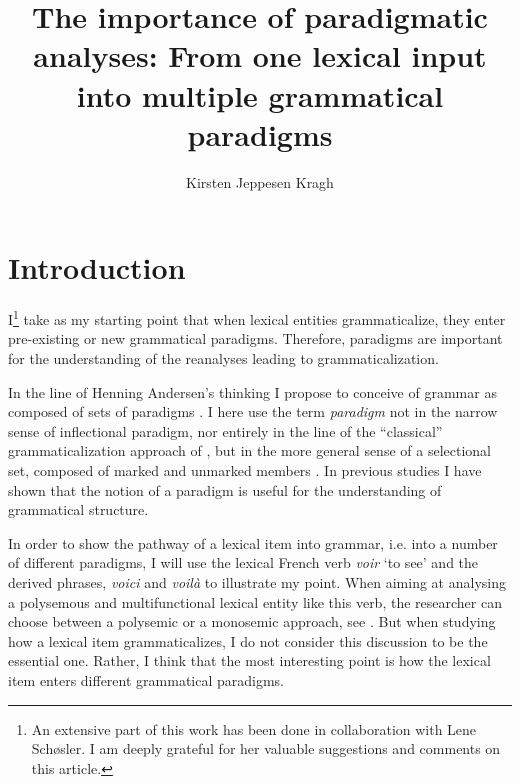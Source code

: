 \documentclass[output=paper]{langsci/langscibook}
\author{Kirsten Jeppesen Kragh\affiliation{University of Copenhagen}}
\title[The importance of paradigmatic analyses]{The importance of paradigmatic analyses: From one lexical input into multiple grammatical paradigms}
\begin{document}
\maketitle 

\section{Introduction} \label{kragh:1}

I\footnote{An extensive part of this work has been done in collaboration with Lene Schøsler. I am deeply grateful for her valuable suggestions and comments on this article.} take as my starting point that when lexical entities grammaticalize, they enter pre-existing or new grammatical paradigms. Therefore, paradigms are important for the understanding of the reanalyses leading to grammaticalization.  

In the line of Henning Andersen’s thinking I propose to conceive of grammar as composed of sets of paradigms \citep{Nørgård-Sørensen2011}. I here use the term \textit{paradigm} not in the narrow sense of inflectional paradigm, nor entirely in the line of the ``classical'' grammaticalization approach of  \citet{Lehmann1985}, but in the more general sense of a selectional set, composed of marked and unmarked members \citep[19]{Andersen2008}. In previous studies \citep{KraghSchosler2014, KraghSchosler2015, KraghSchosler2016, KraghSchosler2019, KraghSchosler2020} I have shown that the notion of a paradigm is useful for the understanding of grammatical structure. 

In order to show the pathway of a lexical item into grammar, i.e. into a number of different paradigms, I will use the lexical French verb \textit{voir} ‘to see’ and the derived phrases, \textit{voici} and \textit{voilà} to illustrate my point. When aiming at analysing a polysemous and multifunctional lexical entity like this verb, the researcher can choose between a polysemic or a monosemic approach, see \citet{Waltereit2002, Waltereit2006}. But when studying how a lexical item grammaticalizes, I do not consider this discussion to be the essential one. Rather, I think that the most interesting point is how the lexical item enters different grammatical paradigms.
\end{document}
